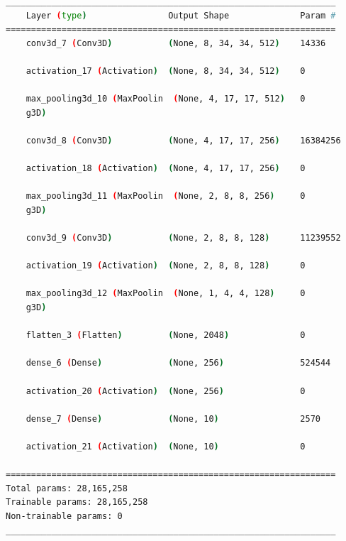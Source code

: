 \begin{lstlisting}[language=Bash,caption={Overview of layers in 3D convolutional network},label={lst:3d_conv_layers},numbers=none,float=htb]
_________________________________________________________________
    Layer (type)                Output Shape              Param #   
=================================================================
    conv3d_7 (Conv3D)           (None, 8, 34, 34, 512)    14336     
                                                                    
    activation_17 (Activation)  (None, 8, 34, 34, 512)    0         
                                                                    
    max_pooling3d_10 (MaxPoolin  (None, 4, 17, 17, 512)   0         
    g3D)                                                            
                                                                    
    conv3d_8 (Conv3D)           (None, 4, 17, 17, 256)    16384256  
                                                                    
    activation_18 (Activation)  (None, 4, 17, 17, 256)    0         
                                                                    
    max_pooling3d_11 (MaxPoolin  (None, 2, 8, 8, 256)     0         
    g3D)                                                            
                                                                    
    conv3d_9 (Conv3D)           (None, 2, 8, 8, 128)      11239552  
                                                                    
    activation_19 (Activation)  (None, 2, 8, 8, 128)      0         
                                                                    
    max_pooling3d_12 (MaxPoolin  (None, 1, 4, 4, 128)     0         
    g3D)                                                            
                                                                    
    flatten_3 (Flatten)         (None, 2048)              0         
                                                                    
    dense_6 (Dense)             (None, 256)               524544    
                                                                    
    activation_20 (Activation)  (None, 256)               0         
                                                                    
    dense_7 (Dense)             (None, 10)                2570      
                                                                    
    activation_21 (Activation)  (None, 10)                0         
                                                                    
=================================================================
Total params: 28,165,258
Trainable params: 28,165,258
Non-trainable params: 0
_________________________________________________________________
\end{lstlisting}

